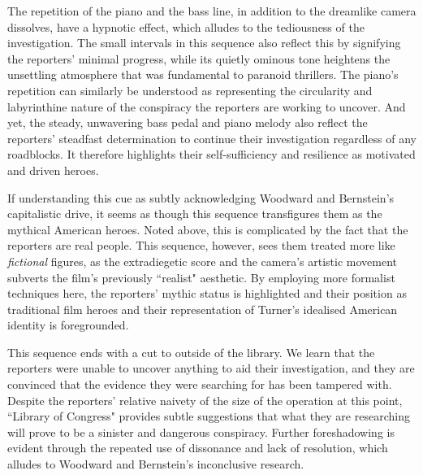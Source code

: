 The repetition of the piano and the bass line, in addition to the dreamlike camera dissolves, have a hypnotic effect, which alludes to the tediousness of the investigation.
The small intervals in this sequence also reflect this by signifying the reporters' minimal progress, while its quietly ominous tone heightens the unsettling atmosphere that was fundamental to paranoid thrillers.
The piano's repetition can similarly be understood as representing the circularity and labyrinthine nature of the conspiracy the reporters are working to uncover.
And yet, the steady, unwavering bass pedal and piano melody also reflect the reporters' steadfast determination to continue their investigation regardless of any roadblocks.
It therefore highlights their self-sufficiency and resilience as motivated and driven heroes.

If understanding this cue as subtly acknowledging Woodward and Bernstein's capitalistic drive, it seems as though this sequence transfigures them as the mythical American heroes.
Noted above, this is complicated by the fact that the reporters are real people.
This sequence, however, sees them treated more like \textit{fictional} figures, as the extradiegetic score and the camera's artistic movement subverts the film's previously ``realist" aesthetic.
By employing more formalist techniques here, the reporters' mythic status is highlighted and their position as traditional film heroes and their representation of Turner's idealised American identity is foregrounded.



This sequence ends with a cut to outside of the library.
We learn that the reporters were unable to uncover anything to aid their investigation, and they are convinced that the evidence they were searching for has been tampered with.
Despite the reporters' relative naivety of the size of the operation at this point, ``Library of Congress" provides subtle suggestions that what they are researching will prove to be a sinister and dangerous conspiracy.
Further foreshadowing is evident through the repeated use of dissonance and lack of resolution, which alludes to Woodward and Bernstein's inconclusive research.



